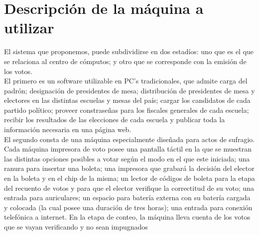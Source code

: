 \section{Descripci\'on de la m\'aquina a utilizar}

El sistema que proponemos, puede subdividirse en dos estad\'ios: uno que es el que se relaciona al centro de c\'omputos; y otro que se corresponde con la emisi\'on de los votos.\\

El primero es un software utilizable en PC's tradicionales, que admite carga del padr\'on; designaci\'on de presidentes de mesa; distribuci\'on de presidentes de mesa y electores en las distintas escuelas y mesas del pa\'is; cargar los candidatos de cada partido pol\'itico; proveer constrase\~nas para los fiscales generales de cada escuela; recibir los resultados de las elecciones de cada escuela y publicar toda la informaci\'on necesaria en una p\'agina web.\\

El segundo consta de una m\'aquina especialmente dise\~nada para actos de sufragio. Cada m\'aquina impresora de voto posee una pantalla t\'actil en la que se muestran las distintas opciones posibles a votar seg\'un el modo en el que este iniciada; una ranura para insertar una boleta; una impresora que grabar\'a la decisi\'on del elector en la boleta y en el chip de la misma; un lector de c\'odigos de boleta para la etapa del recuento de votos y para que el elector verifique la correctitud de su voto; una entrada para auriculares; un espacio para bater\'ia externa con su bater\'ia cargada y colocada (la cual posee una duraci\'on de tres horas); una entrada para conexi\'on telef\'onica a internet. En la etapa de conteo, la m\'aquina lleva cuenta de los votos que se vayan verificando y no sean impugnados

